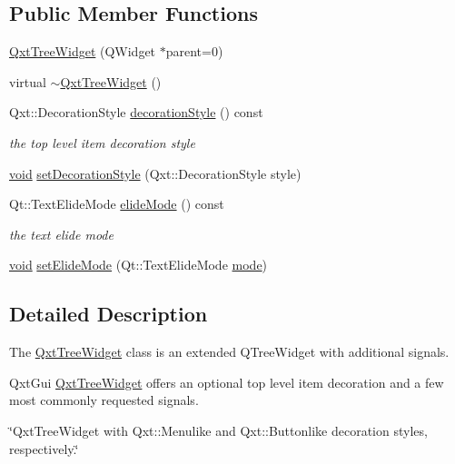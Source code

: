 \subsection*{Public Member Functions}
\begin{DoxyCompactItemize}
\item 
\hyperlink{class_qxt_tree_widget_a2f0aaec7459e90be757b3cbb12883c4c}{Qxt\-Tree\-Widget} (Q\-Widget $\ast$parent=0)
\item 
virtual \hyperlink{class_qxt_tree_widget_a04aa2645e8ac62f89d7d95e4c2fa937d}{$\sim$\-Qxt\-Tree\-Widget} ()
\item 
Qxt\-::\-Decoration\-Style \hyperlink{class_qxt_tree_widget_a44c56b9ad32368c07bcb8bb807603820}{decoration\-Style} () const 
\begin{DoxyCompactList}\small\item\em the top level item decoration style \end{DoxyCompactList}\item 
\hyperlink{group___u_a_v_objects_plugin_ga444cf2ff3f0ecbe028adce838d373f5c}{void} \hyperlink{class_qxt_tree_widget_acaf9cf1f17f41922a41f22987a56dde8}{set\-Decoration\-Style} (Qxt\-::\-Decoration\-Style style)
\item 
Qt\-::\-Text\-Elide\-Mode \hyperlink{class_qxt_tree_widget_a4f8111fa61231c8f6b50255638c98352}{elide\-Mode} () const 
\begin{DoxyCompactList}\small\item\em the text elide mode \end{DoxyCompactList}\item 
\hyperlink{group___u_a_v_objects_plugin_ga444cf2ff3f0ecbe028adce838d373f5c}{void} \hyperlink{class_qxt_tree_widget_ab0216d189b6bce5caab1ea9da5ca7060}{set\-Elide\-Mode} (Qt\-::\-Text\-Elide\-Mode \hyperlink{glext_8h_a1e71d9c196e4683cc06c4b54d53f7ef5}{mode})
\end{DoxyCompactItemize}


\subsection{Detailed Description}
The \hyperlink{class_qxt_tree_widget}{Qxt\-Tree\-Widget} class is an extended Q\-Tree\-Widget with additional signals. 

Qxt\-Gui \hyperlink{class_qxt_tree_widget}{Qxt\-Tree\-Widget} offers an optional top level item decoration and a few most commonly requested signals.

\char`\"{}\-Qxt\-Tree\-Widget with Qxt\-::\-Menulike and Qxt\-::\-Buttonlike decoration styles, respectively.\char`\"{}


